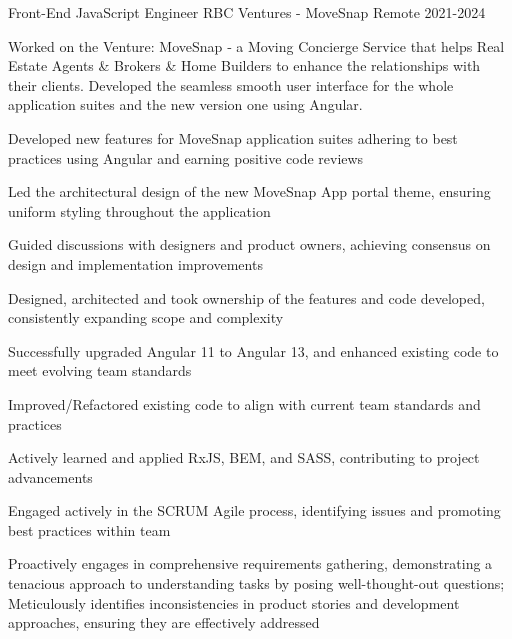 

\begin{cventries}
	
	
  \cventry
{Front-End JavaScript Engineer} %
{RBC Ventures - MoveSnap} %
{Remote} %
{2021-2024} %
{Worked on the Venture: MoveSnap ‑ a Moving Concierge Service that helps Real Estate Agents \& Brokers \& Home Builders to enhance the relationships with their clients. Developed the seamless smooth user interface for the whole application suites and the new version one using Angular.
	\vspace{6.0mm}
	\begin{cvitems}
		\item
		{Developed new features for MoveSnap application suites adhering to best practices using Angular and earning positive code reviews}
		\item
		{Led the architectural design of the new MoveSnap App portal theme, ensuring uniform styling throughout the application}
		\item
		{Guided discussions with designers and product owners, achieving consensus on design and implementation improvements}
		\item
		{Designed, architected and took ownership of the features and code developed, consistently expanding scope and complexity}
		\item
		{Successfully upgraded Angular 11 to Angular 13, and enhanced existing code to meet evolving team standards}
		\item
		{Improved/Refactored existing code to align with current team standards and practices}
		\item
		{Actively learned and applied RxJS, BEM, and SASS, contributing to project advancements}
		\item
		{Engaged actively in the SCRUM Agile process, identifying issues and promoting best practices within team}
		\item 
		{Proactively engages in comprehensive requirements gathering, demonstrating a tenacious approach to understanding tasks by posing well-thought-out questions; Meticulously identifies inconsistencies in product stories and development approaches, ensuring they are effectively addressed}

\end{cvitems}}
\end{cventries}
